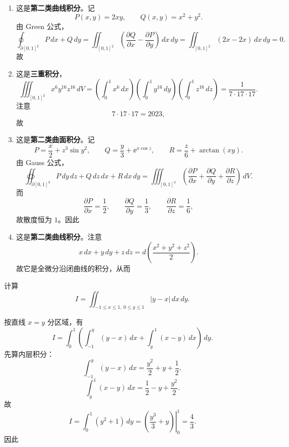 \begin{question}[指出积分类型并计算]
\begin{solution}
\begin{enumerate}[label=(\arabic*),leftmargin=2.6em,itemsep=0.25em,topsep=0.2em]
\item 这是\textbf{第二类曲线积分}。记
\[
P(x,y)=2xy,\qquad Q(x,y)=x^2+y^2.
\]
由 Green 公式，
\[
\oint_{\partial[0,1]^2}P\,dx+Q\,dy
=\iint_{[0,1]^2}\left(\frac{\partial Q}{\partial x}-\frac{\partial P}{\partial y}\right)\,dx\,dy
=\iint_{[0,1]^2}(2x-2x)\,dx\,dy=0.
\]
故

\item 这是\textbf{三重积分}，
\[
\iiint_{[0,1]^3}x^6y^{16}z^{16}\,dV
=\left(\int_0^1 x^6\,dx\right)\left(\int_0^1 y^{16}\,dy\right)\left(\int_0^1 z^{16}\,dz\right)
=\frac{1}{7\cdot17\cdot17}.
\]
注意
\[
7\cdot17\cdot17=2023,
\]
故

\item 这是\textbf{第二类曲面积分}。记
\[
P=\frac{x}{2}+z^3\sin y^2,\qquad
Q=\frac{y}{3}+\ee^{x\cos z},\qquad
R=\frac{z}{6}+\arctan(xy).
\]
由 Gauss 公式，
\[
\oiint_{\partial[0,1]^3}P\,dy\,dz+Q\,dz\,dx+R\,dx\,dy
=\iiint_{[0,1]^3}\left(\frac{\partial P}{\partial x}+\frac{\partial Q}{\partial y}+\frac{\partial R}{\partial z}\right)\,dV.
\]
而
\[
\frac{\partial P}{\partial x}=\frac12,\qquad
\frac{\partial Q}{\partial y}=\frac13,\qquad
\frac{\partial R}{\partial z}=\frac16,
\]
故散度恒为 $1$。因此

\item 这是\textbf{第二类曲线积分}。注意
\[
x\,dx+y\,dy+z\,dz=d\!\left(\frac{x^2+y^2+z^2}{2}\right).
\]
故它是全微分沿闭曲线的积分，从而
\end{enumerate}
\end{solution}
\end{question}

\begin{question}[二重积分]

计算
\[
I=\iint_{-1\le x\le1,\ 0\le y\le1}|y-x|\,dx\,dy.
\]

\begin{solution}
按直线 $x=y$ 分区域，有
\[
I=\int_0^1\left(\int_{-1}^y (y-x)\,dx+\int_y^1 (x-y)\,dx\right)\,dy.
\]
先算内层积分：
\[
\int_{-1}^y (y-x)\,dx=\frac{y^2}{2}+y+\frac12,
\]
\[
\int_y^1 (x-y)\,dx=\frac12-y+\frac{y^2}{2}.
\]
故
\[
I=\int_0^1 (y^2+1)\,dy
=\left.\left(\frac{y^3}{3}+y\right)\right|_0^1
=\frac43.
\]
因此
\end{solution}
\end{question}


